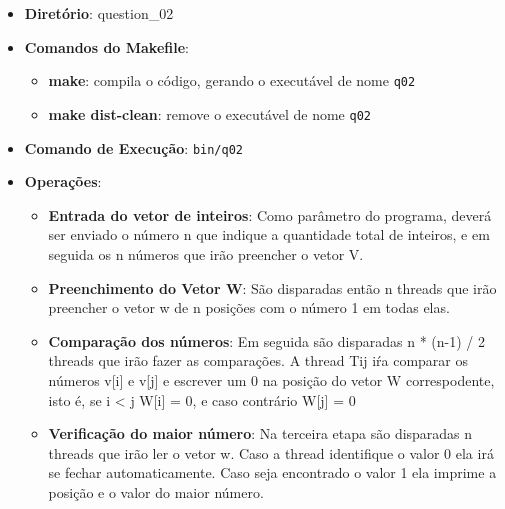 \begin{itemize}
	\item{\textbf{Diretório}: question\_02}
	\item{\textbf{Comandos do Makefile}:
	\begin{itemize}
		\item{\textbf{make}: compila o código, gerando o executável de nome \texttt{q02}}
		\item{\textbf{make dist-clean}: remove o executável de nome \texttt{q02}}
	\end{itemize}}
	\item{\textbf{Comando de Execução}: \texttt{bin/q02}}
	\item{\textbf{Operações}: 
	\begin{itemize}
		\item{\textbf{Entrada do vetor de inteiros}: Como parâmetro do programa, deverá ser enviado o número n que indique a quantidade total de inteiros, e em seguida os n números que irão preencher o vetor V.}
		\item{\textbf{Preenchimento do Vetor W}: São disparadas então n threads que irão preencher o vetor w de n posições com o número 1 em todas elas.}
		\item{\textbf{Comparação dos números}: Em seguida são disparadas n * (n-1) / 2 threads que irão fazer as comparações. A thread Tij iŕa comparar os números v[i] e v[j] e escrever um 0 na posição do vetor W correspodente, isto é, se i < j W[i] = 0, e caso contrário W[j] = 0}
		\item{\textbf{Verificação do maior número}: Na terceira etapa são disparadas n threads que irão ler o vetor w. Caso a thread identifique o valor 0 ela irá se fechar automaticamente. Caso seja encontrado o valor 1 ela imprime a posição e o valor do maior número.}
	\end{itemize}}
\end{itemize}
